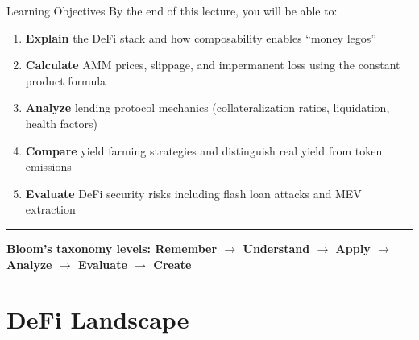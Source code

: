\documentclass[8pt,aspectratio=169]{beamer}
\newcommand{\bottomnote}[1]{\vfill\vspace{-2mm}\textcolor{mllavender2}{\rule{\textwidth}{0.4pt}}\vspace{1mm}\footnotesize\textbf{#1}}
\begin{document}
\begin{frame}{Learning Objectives}
By the end of this lecture, you will be able to:
\begin{enumerate}
\item \textbf{Explain} the DeFi stack and how composability enables ``money legos''
\item \textbf{Calculate} AMM prices, slippage, and impermanent loss using the constant product formula
\item \textbf{Analyze} lending protocol mechanics (collateralization ratios, liquidation, health factors)
\item \textbf{Compare} yield farming strategies and distinguish real yield from token emissions
\item \textbf{Evaluate} DeFi security risks including flash loan attacks and MEV extraction
\end{enumerate}
\bottomnote{Bloom's taxonomy levels: Remember $\rightarrow$ Understand $\rightarrow$ Apply $\rightarrow$ Analyze $\rightarrow$ Evaluate $\rightarrow$ Create}
\end{frame}


\section{DeFi Landscape}
\end{document}
